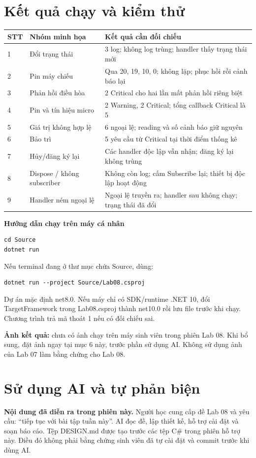 \documentclass[11pt,a4paper]{article}
\begin{document}
\section{Kết quả chạy và kiểm thử}

\begin{tabularx}{\linewidth}{@{}p{0.7cm}p{4.2cm}X@{}}\toprule
STT & Nhóm minh họa & Kết quả cần đối chiếu\\\midrule
1 & Đổi trạng thái & 3 log; không log trùng; handler thấy trạng thái mới\\
2 & Pin máy chiếu & Qua 20, 19, 10, 0; không lặp; phục hồi rồi cảnh báo lại\\
3 & Phản hồi điều hòa & 2 Critical cho hai lần mất phản hồi riêng biệt\\
4 & Pin và tín hiệu micro & 2 Warning, 2 Critical; tổng callback Critical là 5\\
5 & Giá trị không hợp lệ & 6 ngoại lệ; reading và số cảnh báo giữ nguyên\\
6 & Bảo trì & 5 yêu cầu từ Critical tại thời điểm thống kê\\
7 & Hủy/đăng ký lại & Các handler độc lập vẫn nhận; đăng ký lại không trùng\\
8 & Dispose / không subscriber & Không còn log; cấm Subscribe lại; thiết bị độc lập hoạt động\\
9 & Handler ném ngoại lệ & Ngoại lệ truyền ra; handler sau không chạy; trạng thái đã đổi\\\bottomrule
\end{tabularx}

\textbf{Hướng dẫn chạy trên máy cá nhân}
\begin{Verbatim}[fontsize=\small]
cd Source
dotnet run
\end{Verbatim}
Nếu terminal đang ở thư mục chứa Source, dùng:
\begin{Verbatim}[fontsize=\small]
dotnet run --project Source/Lab08.csproj
\end{Verbatim}
Dự án mặc định net8.0. Nếu máy chỉ có SDK/runtime .NET 10, đổi TargetFramework trong Lab08.csproj thành net10.0 rồi lưu file trước khi chạy. Chương trình trả mã thoát 1 nếu có đối chiếu sai.

\textbf{Ảnh kết quả:} chưa có ảnh chạy trên máy sinh viên trong phiên Lab 08. Khi bổ sung, đặt ảnh ngay tại mục 6 này, trước phần sử dụng AI. Không sử dụng ảnh của Lab 07 làm bằng chứng cho Lab 08.
\newpage
\section{Sử dụng AI và tự phản biện}
\textbf{Nội dung đã diễn ra trong phiên này.} Người học cung cấp đề Lab 08 và yêu cầu: ``tiếp tục với bài tập tuần này''. AI đọc đề, lập thiết kế, hỗ trợ cài đặt và soạn báo cáo. Tệp DESIGN.md được tạo trước các tệp C\# trong phiên hỗ trợ này. Điều đó không phải bằng chứng sinh viên đã tự cài đặt và commit trước khi dùng AI.
\end{document}

